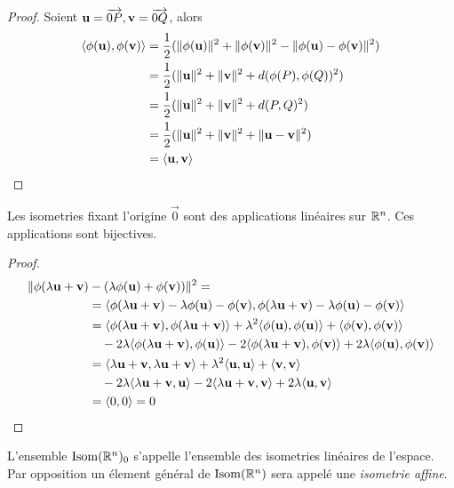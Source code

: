 \begin{proof}
	Soient $\mathbf{u} = \overrightarrow{0P}, \mathbf{v} = \overrightarrow{0Q}$, alors
	\begin{align*}
		\langle \phi(\mathbf{u}), \phi(\mathbf{v}) \rangle &= \frac{1}{2}(\|\phi(\mathbf{u})\|^2 +	
		\|\phi(\mathbf{v})\|^2 - \| \phi(\mathbf{u}) - \phi(\mathbf{v}) \|^2)\\
		&= \frac{1}{2}(\| \mathbf{u} \|^2 + \| \mathbf{v} \|^2 + d(\phi(P), \phi(Q))^2)\\
		&= \frac{1}{2}(\| \mathbf{u} \|^2 + \| \mathbf{v} \|^2 + d(P, Q)^2)\\
		&= \frac{1}{2}(\| \mathbf{u} \|^2 + \| \mathbf{v} \|^2
			+ \|\mathbf{u} - \mathbf{v}\|^2)\\
		&= \langle \mathbf{u}, \mathbf{v} \rangle
	\end{align*}
\end{proof}

\begin{theorem}
	Les isometries fixant l'origine $\vec{0}$ sont des applications linéaires sur
	$\mathbb{R}^n$. Ces applications sont bijectives.
\end{theorem}

\begin{proof}
	\begin{align*}
		\| \phi(\lambda \mathbf{u} + \mathbf{v})
		&- (\lambda \phi(\mathbf{u}) + \phi(\mathbf{v}))\|^2 =\\
		&= \langle \phi(\lambda \mathbf{u} + \mathbf{v})
		- \lambda \phi(\mathbf{u}) - \phi(\mathbf{v}), \phi(\lambda \mathbf{u} + \mathbf{v})
		- \lambda \phi(\mathbf{u}) - \phi(\mathbf{v}) \rangle
		\\
		&= \langle \phi(\lambda \mathbf{u} + \mathbf{v}), \phi(\lambda \mathbf{u} + \mathbf{v}) \rangle
		+ \lambda^2 \langle \phi(\mathbf{u}), \phi(\mathbf{u}) \rangle
		+ \langle \phi(\mathbf{v}), \phi(\mathbf{v}) \rangle\\
		&\quad- 2\lambda\langle \phi(\lambda\mathbf{u} + \mathbf{v}), \phi(\mathbf{u}) \rangle
		- 2\langle \phi(\lambda\mathbf{u} + \mathbf{v}), \phi(\mathbf{v}) \rangle
		+ 2\lambda\langle \phi(\mathbf{u}), \phi(\mathbf{v}) \rangle
		\\
		&= \langle \lambda \mathbf{u} + \mathbf{v}, \lambda \mathbf{u} + \mathbf{v} \rangle
		+ \lambda^2 \langle \mathbf{u}, \mathbf{u} \rangle
		+ \langle \mathbf{v}, \mathbf{v} \rangle\\
		&\quad- 2\lambda\langle \lambda\mathbf{u} + \mathbf{v}, \mathbf{u} \rangle
		- 2\langle \lambda\mathbf{u} + \mathbf{v}, \mathbf{v} \rangle
		+ 2\lambda\langle \mathbf{u}, \mathbf{v} \rangle
		\\
		&= \langle 0, 0 \rangle = 0
	\end{align*}
\end{proof}

\begin{definition}
	L'ensemble $\operatorname{Isom}(\mathbb{R}^n)_0$ s'appelle l'ensemble des isometries linéaires de
	l'espace. Par opposition un élement général de $\operatorname{Isom}(\mathbb{R}^n)$ sera appelé une
	\emph{isometrie affine}.
\end{definition}

